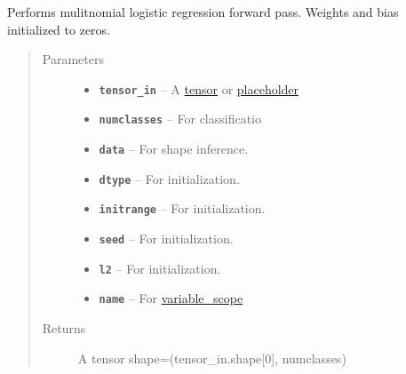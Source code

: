 \documentclass[letterpaper,10pt,english]{sphinxmanual}
\begin{document}
\begin{fulllineitems}
\label{node_ops:node_ops.mult_log_reg}
Performs mulitnomial logistic regression forward pass. Weights and bias initialized to zeros.
\begin{quote}\begin{description}
\item[{Parameters}] \leavevmode\begin{itemize}
\item {} 
\textbf{\texttt{tensor\_in}} -- A \href{https://www.tensorflow.org/versions/r0.7/api\_docs/python/framework.html\#Tensor}{tensor} or \href{https://www.tensorflow.org/versions/r0.7/api\_docs/python/io\_ops.html\#placeholders}{placeholder}

\item {} 
\textbf{\texttt{numclasses}} -- For classificatio

\item {} 
\textbf{\texttt{data}} -- For shape inference.

\item {} 
\textbf{\texttt{dtype}} -- For {\hyperref[node_ops:node_ops.weights]{\emph{}}} initialization.

\item {} 
\textbf{\texttt{initrange}} -- For {\hyperref[node_ops:node_ops.weights]{\emph{}}} initialization.

\item {} 
\textbf{\texttt{seed}} -- For {\hyperref[node_ops:node_ops.weights]{\emph{}}} initialization.

\item {} 
\textbf{\texttt{l2}} -- For {\hyperref[node_ops:node_ops.weights]{\emph{}}} initialization.

\item {} 
\textbf{\texttt{name}} -- For \href{https://www.tensorflow.org/versions/r0.7/how\_tos/variable\_scope/index.html}{variable\_scope}

\end{itemize}

\item[{Returns}] \leavevmode
A tensor shape=(tensor\_in.shape{[}0{]}, numclasses)

\end{description}\end{quote}

\end{fulllineitems}
\end{document}
